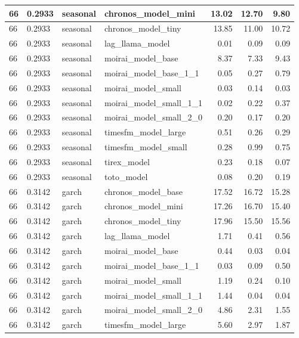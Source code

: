 {\begin{tabular}{llllrrr}
\midrule
66 & 0.2933 & seasonal & chronos\_model\_mini & 13.02 & 12.70 & 9.80 \\
\midrule
66 & 0.2933 & seasonal & chronos\_model\_tiny & 13.85 & 11.00 & 10.72 \\
\midrule
66 & 0.2933 & seasonal & lag\_llama\_model & 0.01 & 0.09 & 0.09 \\
\midrule
66 & 0.2933 & seasonal & moirai\_model\_base & 8.37 & 7.33 & 9.43 \\
\midrule
66 & 0.2933 & seasonal & moirai\_model\_base\_1\_1 & 0.05 & 0.27 & 0.79 \\
\midrule
66 & 0.2933 & seasonal & moirai\_model\_small & 0.03 & 0.14 & 0.03 \\
\midrule
66 & 0.2933 & seasonal & moirai\_model\_small\_1\_1 & 0.02 & 0.22 & 0.37 \\
\midrule
66 & 0.2933 & seasonal & moirai\_model\_small\_2\_0 & 0.20 & 0.17 & 0.20 \\
\midrule
66 & 0.2933 & seasonal & timesfm\_model\_large & 0.51 & 0.26 & 0.29 \\
\midrule
66 & 0.2933 & seasonal & timesfm\_model\_small & 0.28 & 0.99 & 0.75 \\
\midrule
66 & 0.2933 & seasonal & tirex\_model & 0.23 & 0.18 & 0.07 \\
\midrule
66 & 0.2933 & seasonal & toto\_model & 0.08 & 0.20 & 0.19 \\
\midrule
66 & 0.3142 & garch & chronos\_model\_base & 17.52 & 16.72 & 15.28 \\
\midrule
66 & 0.3142 & garch & chronos\_model\_mini & 17.26 & 16.70 & 15.40 \\
\midrule
66 & 0.3142 & garch & chronos\_model\_tiny & 17.96 & 15.50 & 15.56 \\
\midrule
66 & 0.3142 & garch & lag\_llama\_model & 1.71 & 0.41 & 0.56 \\
\midrule
66 & 0.3142 & garch & moirai\_model\_base & 0.44 & 0.03 & 0.04 \\
\midrule
66 & 0.3142 & garch & moirai\_model\_base\_1\_1 & 0.03 & 0.09 & 0.50 \\
\midrule
66 & 0.3142 & garch & moirai\_model\_small & 1.19 & 0.24 & 0.10 \\
\midrule
66 & 0.3142 & garch & moirai\_model\_small\_1\_1 & 1.44 & 0.04 & 0.04 \\
\midrule
66 & 0.3142 & garch & moirai\_model\_small\_2\_0 & 4.86 & 2.31 & 1.55 \\
\midrule
66 & 0.3142 & garch & timesfm\_model\_large & 5.60 & 2.97 & 1.87 \\

\end{tabular}}
